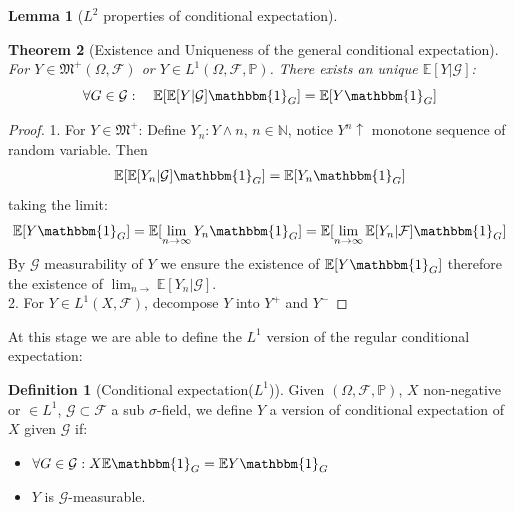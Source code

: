 \documentclass[a4paper,11pt]{book}
\newtheorem{theorem}{Theorem}[section]
\newtheorem{lemma}[theorem]{Lemma}
\theoremstyle{definition}
\newtheorem{definition}{Definition}[section]
\theoremstyle{remark}
\begin{document}
\begin{lemma}[$L^2$ properties of conditional expectation]
	
\end{lemma}

\begin{theorem}[Existence and Uniqueness of the general conditional expectation] 
For $Y \in \mathfrak{M}^+(\Omega, \mathcal{F})$ or $Y \in L^1(\Omega, \mathcal{F}, \mathbb{P})$. There exists an unique $\mathbb{E}[Y|\mathcal{G}]$:
		\begin{equation*}
			\forall G \in \mathcal{G}: \quad \mathbb{E}[\mathbb{E}[Y|\mathcal{G}] \mathbbm{1}_G] = \mathbb{E}[Y \mathbbm{1}_G]
		\end{equation*}
\end{theorem}
\begin{proof}
	1. For $Y \in \mathfrak{M}^+$: Define $Y_n: Y \wedge n$, $n \in \mathbb{N}$, notice $Y^n \uparrow$ monotone sequence of random variable. Then 
	\begin{align*}
		\mathbb{E}[\mathbb{E}[Y_n|\mathcal{G}] \mathbbm{1}_G] =  \mathbb{E}[Y_n \mathbbm{1}_G]
	\end{align*}
	taking the limit:
	\begin{align*}
		\mathbb{E}[Y\mathbbm{1}_G] = \mathbb{E}[\lim_{n \rightarrow \infty} Y_n \mathbbm{1}_G] = \mathbb{E}[\lim_{n \rightarrow \infty}\mathbb{E}[Y_n|\mathcal{F}] \mathbbm{1}_G]
	\end{align*}
	By $\mathcal{G}$ measurability of $Y$ we ensure the existence of $\mathbb{E}[Y\mathbbm{1}_G]$ therefore the existence of $\lim_{n \rightarrow} \mathbb{E}[Y_n|\mathcal{G}]$.\\
	2. For $Y \in L^1(X, \mathcal{F})$, decompose $Y$ into $Y^+$ and $Y^-$ 
\end{proof}


At this stage we are able to define the $L^1$ version of the regular conditional expectation:
\begin{definition}[Conditional expectation($L^1$)]
	Given $(\Omega, \mathcal{F}, \mathbb{P})$, $X$ non-negative or $\in L^1$, $\mathcal{G} \subset \mathcal{F}$ a sub $\sigma$-field, we define $Y$ a version of conditional expectation of $X$ given $\mathcal{G}$ if:
	\begin{itemize}
		\item $\forall G \in \mathcal{G}: X \mathbb{E} \mathbbm{1}_G = \mathbb{E} Y \mathbbm{1}_G$
		\item $Y$ is $\mathcal{G}$-measurable.
	\end{itemize}
\end{definition}
\end{document}

